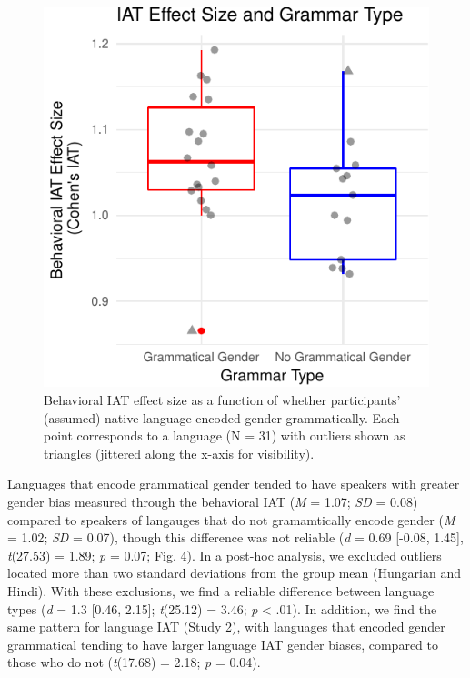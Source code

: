 \documentclass[10pt, letterpaper]{article}
\newenvironment{CodeChunk}{}{}
\begin{document}
\begin{CodeChunk}
\begin{figure}[t]

{\centering \includegraphics{figs/grammatical_gender_plot-1} 

}

\caption[Behavioral IAT effect size as a function of whether participants' (assumed) native language encoded gender grammatically]{Behavioral IAT effect size as a function of whether participants' (assumed) native language encoded gender grammatically. Each point corresponds to a language (N = 31) with outliers shown as triangles (jittered along the x-axis for visibility).}\label{fig:grammatical_gender_plot}
\end{figure}
\end{CodeChunk}

Languages that encode grammatical gender tended to have speakers with
greater gender bias measured through the behavioral IAT (\emph{M} =
1.07; \emph{SD} = 0.08) compared to speakers of langauges that do not
gramamtically encode gender (\emph{M} = 1.02; \emph{SD} = 0.07), though
this difference was not reliable (\emph{d} = 0.69 {[}-0.08, 1.45{]},
\emph{t}(27.53) = 1.89; \emph{p} = 0.07; Fig. 4). In a post-hoc
analysis, we excluded outliers located more than two standard deviations
from the group mean (Hungarian and Hindi). With these exclusions, we
find a reliable difference between language types (\emph{d} = 1.3
{[}0.46, 2.15{]}; \emph{t}(25.12) = 3.46; \emph{p} \textless{} .01). In
addition, we find the same pattern for language IAT (Study 2), with
languages that encoded gender grammatical tending to have larger
language IAT gender biases, compared to those who do not
(\emph{t}(17.68) = 2.18; \emph{p} = 0.04).
\end{document}
